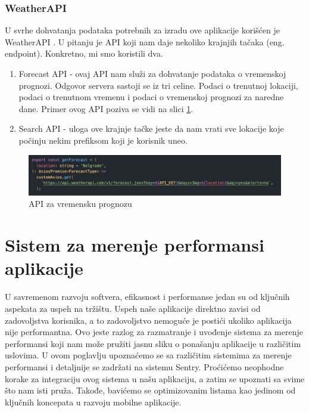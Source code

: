 \documentclass[12pt,oneside]{memoir}
\begin{document}
\subsection{WeatherAPI}

U svrhe dohvatanja podataka potrebnih za izradu ove aplikacije korišćen je WeatherAPI \cite{WeatherAPI}. U pitanju je API koji nam daje nekoliko krajnjih tačaka (eng. endpoint). Konkretno, mi smo koristili dva. 

\begin{enumerate}
    \item Forecast API - ovaj API nam služi za dohvatanje podataka o vremenskoj prognozi. Odgovor servera sastoji se iz tri celine. Podaci o trenutnoj lokaciji, podaci o trenutnom vremenu i podaci o vremenskoj prognozi za naredne dane. Primer ovog API poziva se vidi na slici \ref{fig:forecastAPI}.
    \item Search API - uloga ove krajnje tačke jeste da nam vrati sve lokacije koje počinju nekim prefiksom koji je korisnik uneo. 
\end{enumerate}

\newpage

\begin{figure}[h]
    \centering
    \includegraphics[scale=0.5]{docs/images/chapterFour/forecastAPI.png}
    \caption{API za vremensku prognozu}
    \label{fig:forecastAPI}
\end{figure}

\chapter{Sistem za merenje performansi aplikacije}

U savremenom razvoju softvera, efikasnost i performanse jedan su od ključnih aspekata za uspeh na tržištu. Uspeh naše aplikacije direktno zavisi od zadovoljstva korisnika, a to zadovoljstvo nemoguće je postići ukoliko aplikacija nije performantna. Ovo jeste razlog za razmatranje i uvođenje sistema za merenje performansi koji nam može pružiti jasnu sliku o ponašanju aplikacije u različitim uslovima. 
\newline
U ovom poglavlju upoznaćemo se sa različitim sistemima za merenje performansi i detaljnije se zadržati na sistemu Sentry\cite{Sentry}. Proćićemo neophodne korake za integraciju ovog sistema u našu aplikaciju, a zatim se upoznati sa svime što nam isti pruža. Takođe, bavićemo se optimizovanim listama kao jedinom od ključnih koncepata u razvoju mobilne aplikacije.
\end{document}
